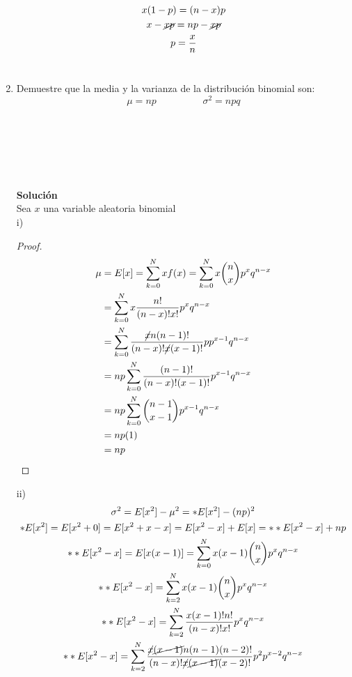 \begin{enumerate}
\begin{gather*}
    x(1 - p) = (n - x)p\\
    x - \cancel{xp} = np - \cancel{xp}\\
    p = \frac{x}{n}
    \end{gather*}\\
    \item Demuestre que la media y la varianza de la distribución binomial son:\\
    $$ \mu = np\hspace{2cm} \sigma^2 = npq$$\\\\\\\\\\\\
    \textbf{Solución}\\
    Sea $x$ una variable aleatoria binomial\\
    i)
    \begin{proof}
    \begin{align*}
    \mu &= E[x] = \displaystyle\sum_{k=0}^N xf(x) = \displaystyle\sum_{k=0}^N x{n \choose x}p^xq^{n-x}\\
    &=  \displaystyle\sum_{k=0}^N x\frac{n!}{(n-x)!x!}p^xq^{n-x}\\
    &= \displaystyle\sum_{k=0}^N \frac{\cancel{x}n(n-1)!}{(n-x)!\cancel{x}(x-1)!}pp^{x-1}q^{n-x}\\
    &= np\displaystyle\sum_{k=0}^N \frac{(n-1)!}{(n-x)!(x-1)!}p^{x-1}q^{n-x}\\
    &= np\displaystyle\sum_{k=0}^N {n-1 \choose x - 1}p^{x-1}q^{n-x}\\
    &= np(1)\\
    &= np
    \end{align*}
    \end{proof}
    ii)
    \begin{gather*}
    \sigma^2 = E[x^2] - \mu^2 = *E[x^2] - (np)^2\\
    *E[x^2] = E[x^2 + 0] = E[x^2 +x -x] = E[x^2 - x]+ E[x] = **E[x^2 - x]+ np\\
    **E[x^2 - x] = E[x(x-1)] = \displaystyle\sum_{k=0}^N x(x-1){n \choose x}p^xq^{n-x}\\
    **E[x^2 - x] = \displaystyle\sum_{k=2}^N x(x-1){n \choose x}p^xq^{n-x}\\
    **E[x^2 - x] = \displaystyle\sum_{k=2}^N\frac{x(x-1)!n!}{(n-x)!x!}p^xq^{n-x}\\
    **E[x^2 - x] = \displaystyle\sum_{k=2}^N\frac{\cancel{x}\cancel{(x-1)}n(n-1)(n-2)!}{(n-x)!\cancel{x}\cancel{(x-1)}(x-2)!}p^2p^{x-2}q^{n-x}\\

\end{gather*}
\end{enumerate}
